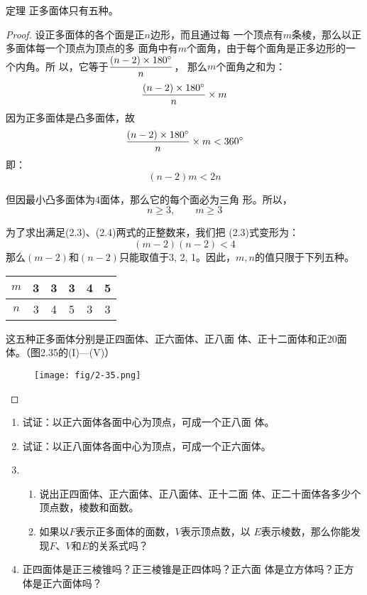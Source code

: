 \begin{blk}
    {定理} 正多面体只有五种。
\end{blk}

\begin{proof}
    设正多面体的各个面是正$n$边形，而且通过每
    一个顶点有$m$条棱，那么以正多面体每一个顶点为顶点的多
    面角中有$m$个面角，由于每个面角是正多边形的一个内角。所
    以，它等于$\dfrac{(n-2)\times 180^{\circ}}{n}$，
    那么$m$个面角之和为：
\[\dfrac{(n-2)\times 180^{\circ}}{n}\times m\]
因为正多面体是凸多面体，故
\[\dfrac{(n-2)\times 180^{\circ}}{n}\times m<360^{\circ}\]
即：
\begin{equation}
    (n-2)m<2n
\end{equation}

但因最小凸多面体为4面体，那么它的每个面必为三角
形。所以，
\begin{equation}
    n\ge 3,\qquad m\ge 3
\end{equation}

为了求出满足(2.3)、(2.4)两式的正整数来，我们把
(2.3)式变形为：
\[(m-2)(n-2)<4\]
那么$(m-2)$和$(n-2)$只能取值于3, 2, 1。因此，$m,n$的值只限于下列五种。
\begin{center}
\begin{tabular}{c|ccccc}
    \hline
   $ m$&3&3&3&4&5\\
   \hline
$n$&3&4&5&3&3\\
\hline
\end{tabular}
\end{center}
这五种正多面体分别是正四面体、正六面体、正八面
体、正十二面体和正20面体。（图2.35的(I)—(V)）
\begin{figure}[htp]
    \centering
\texttt{[image: fig/2-35.png]}
    \caption{}
\end{figure}
\end{proof}

\begin{ex}
\begin{enumerate}
    \item 试证：以正六面体各面中心为顶点，可成一个正八面
    体。
    \item 试证：以正八面体各面中心为顶点，可成一个正六面体。
    \item \begin{enumerate}
        \item 说出正四面体、正六面体、正八面体、正十二面
    体、正二十面体各多少个顶点数，棱数和面数。
    \item 如果以$F$表示正多面体的面数，$V$表示顶点数，以
    $E$表示棱数，那么你能发现$F$、$V$和$E$的关系式吗？
\end{enumerate}
\item 正四面体是正三棱锥吗？正三棱锥是正四体吗？正六面
    体是立方体吗？正方体是正六面体吗？
\end{enumerate}
\end{ex}

